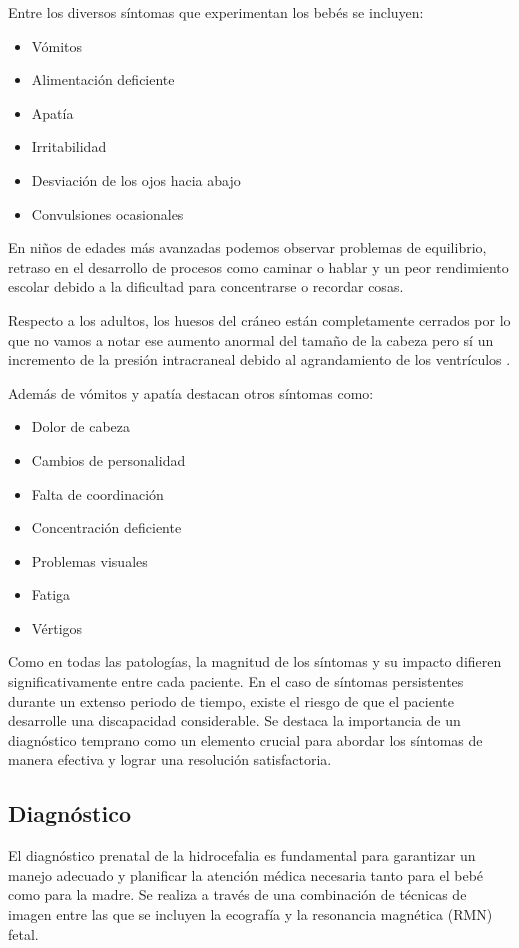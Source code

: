 Entre los diversos síntomas que experimentan los bebés se incluyen:
\begin{itemize}
    \item Vómitos
    \item Alimentación deficiente
    \item Apatía
    \item Irritabilidad
    \item Desviación de los ojos hacia abajo
    \item Convulsiones ocasionales
\end{itemize}
En niños de edades más avanzadas podemos observar problemas de equilibrio, retraso en el desarrollo de procesos como caminar o hablar y un peor rendimiento escolar debido a la dificultad para concentrarse o recordar cosas.

Respecto a los adultos, los huesos del cráneo están completamente cerrados por lo que no vamos a notar ese aumento anormal del tamaño de la cabeza pero sí un incremento de la presión intracraneal debido al agrandamiento de los ventrículos \cite{sint_adult}.

Además de vómitos y apatía destacan otros síntomas como: 
\begin{itemize}
    \item Dolor de cabeza
    \item Cambios de personalidad
    \item Falta de coordinación
    \item Concentración deficiente
    \item Problemas visuales
    \item Fatiga
    \item Vértigos
\end{itemize}
Como en todas las patologías, la magnitud de los síntomas y su impacto difieren significativamente entre cada paciente. En el caso de síntomas persistentes durante un extenso periodo de tiempo, existe el riesgo de que el paciente desarrolle una discapacidad considerable. Se destaca la importancia de un diagnóstico temprano como un elemento crucial para abordar los síntomas de manera efectiva y lograr una resolución satisfactoria.

\subsection{Diagnóstico}
El diagnóstico prenatal de la hidrocefalia es fundamental para garantizar un manejo adecuado y planificar la atención médica necesaria tanto para el bebé como para la madre. Se realiza a través de una combinación de técnicas de imagen entre las que se incluyen la ecografía y la resonancia magnética (RMN) fetal. 

